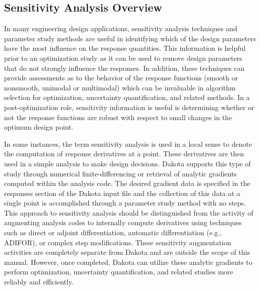 \subsection{Sensitivity Analysis Overview}\label{dace:sa:overview}

In many engineering design applications, sensitivity analysis
techniques and parameter study methods are useful in identifying which
of the design parameters have the most influence on the response
quantities. This information is helpful prior to an optimization study
as it can be used to remove design parameters that do not strongly
influence the responses. In addition, these techniques can provide
assessments as to the behavior of the response functions (smooth or
nonsmooth, unimodal or multimodal) which can be invaluable in
algorithm selection for optimization, uncertainty quantification, and
related methods. In a post-optimization role, sensitivity information
is useful is determining whether or not the response functions are
robust with respect to small changes in the optimum design point.

In some instances, the term sensitivity analysis is used in a local
sense to denote the computation of response derivatives at a point.
These derivatives are then used in a simple analysis to make design
decisions. Dakota supports this type of study through numerical
finite-differencing or retrieval of analytic gradients computed within
the analysis code. The desired gradient data is specified in the
responses section of the Dakota input file and the collection of this
data at a single point is accomplished through a parameter study
method with no steps. This approach to sensitivity analysis should be
distinguished from the activity of augmenting analysis codes to
internally compute derivatives using techniques such as direct or
adjoint differentiation, automatic differentiation (e.g., ADIFOR), or
complex step modifications. These sensitivity augmentation activities
are completely separate from Dakota and are outside the scope of this
manual. However, once completed, Dakota can utilize these analytic
gradients to perform optimization, uncertainty quantification, and
related studies more reliably and efficiently.

